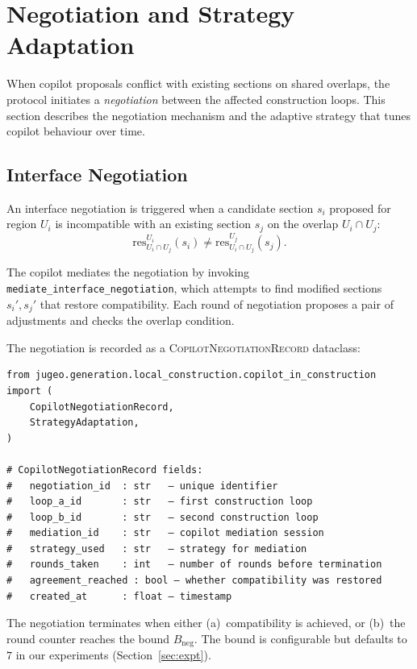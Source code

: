\documentclass[11pt]{article}
\newcommand{\CNR}{\textsc{CopilotNegotiationRecord}}
\newcommand{\negbound}{B_{\mathrm{neg}}}
\newcommand{\restrict}{\mathrm{res}}
\begin{document}
\section{Negotiation and Strategy
         Adaptation}\label{sec:negotiation}

When copilot proposals conflict with existing sections on shared
overlaps, the protocol initiates a \emph{negotiation} between the
affected construction loops.  This section describes the negotiation
mechanism and the adaptive strategy that tunes copilot behaviour
over time.

\subsection{Interface Negotiation}\label{sec:neg-mediation}

An interface negotiation is triggered when a candidate section $s_i$
proposed for region $U_i$ is incompatible with an existing section
$s_j$ on the overlap $U_i \cap U_j$:
\[
  \restrict^{U_i}_{U_i \cap U_j}(s_i)
  \neq \restrict^{U_j}_{U_i \cap U_j}(s_j).
\]

The copilot mediates the negotiation by invoking
\texttt{mediate\_interface\_negotiation}, which attempts to find
modified sections $s_i', s_j'$ that restore compatibility.  Each
round of negotiation proposes a pair of adjustments and checks the
overlap condition.

The negotiation is recorded as a \CNR{} dataclass:

\begin{lstlisting}
from jugeo.generation.local_construction.copilot_in_construction import (
    CopilotNegotiationRecord,
    StrategyAdaptation,
)

# CopilotNegotiationRecord fields:
#   negotiation_id  : str   — unique identifier
#   loop_a_id       : str   — first construction loop
#   loop_b_id       : str   — second construction loop
#   mediation_id    : str   — copilot mediation session
#   strategy_used   : str   — strategy for mediation
#   rounds_taken    : int   — number of rounds before termination
#   agreement_reached : bool — whether compatibility was restored
#   created_at      : float — timestamp
\end{lstlisting}

The negotiation terminates when either (a)~compatibility is
achieved, or (b)~the round counter reaches the bound $\negbound$.
The bound is configurable but defaults to $7$ in our experiments
(Section~\ref{sec:expt}).
\end{document}
